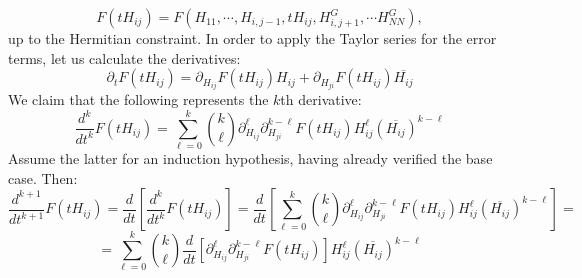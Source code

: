 \documentclass[11pt]{article}
\begin{document}
$$F(tH_{ij}) = F(H_{11}, \cdots, H_{i, j-1}, tH_{ij}, H_{i, j+1}^G, \cdots H_{NN}^G),$$
up to the Hermitian constraint. In order to apply the Taylor series for the error terms, let us calculate the derivatives: $$\partial_t F(tH_{ij}) = \partial_{H_{ij}} F(tH_{ij})H_{ij} + \partial_{H_{ji}} F(tH_{ij})\overline{H_{ij}}$$
We claim that the following represents the $k$th derivative: 
\begin{equation*}\frac{d^k}{dt^k} F(tH_{ij}) = \sum_{\ell=0}^k \binom{k}{\ell}\partial_{H_{ij}}^\ell \partial_{H_{ji}}^{k-\ell} F(tH_{ij})H_{ij}^\ell \left(\overline{H_{ij}}\right)^{k-\ell}\tag{8.4}\end{equation*}
Assume the latter for an induction hypothesis, having already verified the base case. Then: 
$$\frac{d^{k+1}}{dt^{k+1}} F(tH_{ij}) = \frac{d}{dt}\left[\frac{d^k}{dt^k} F(tH_{ij}) \right]=\frac{d}{dt}\left[ \sum_{\ell=0}^k \binom{k}{\ell}\partial_{H_{ij}}^\ell \partial_{H_{ji}}^{k-\ell} F(tH_{ij})H_{ij}^\ell \left(\overline{H_{ij}}\right)^{k-\ell}\right]=$$
$$=\sum_{\ell=0}^k\binom{k}{\ell}\frac{d}{dt}\left[\partial_{H_{ij}}^\ell \partial_{H_{ji}}^{k-\ell} F(tH_{ij})\right]H_{ij}^\ell \left(\overline{H_{ij}}\right)^{k-\ell}$$
\end{document}
